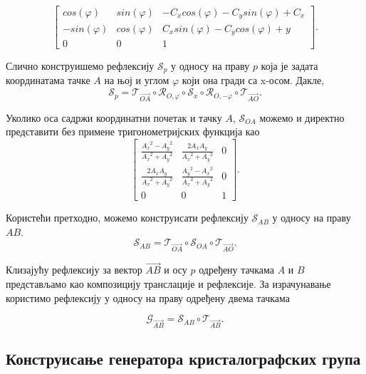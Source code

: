 \documentclass[12pt]{article}
\begin{document}
\[\begin{bmatrix}cos(\varphi) & sin(\varphi) & -C_x cos(\varphi) - C_y sin(\varphi) + C_x\\ -sin(\varphi) & cos(\varphi)&C_x sin(\varphi) - C_y cos(\varphi) +y\\ 0 & 0 & 1\end{bmatrix}.\]

Слично конструишемо рефлексију $\mathcal{S}_p$ у односу на праву $p$ која је задата координатама тачке $A$ на њој и углом $\varphi$ који она гради са x-осом. Дакле, 
$$\mathcal{S}_{p} = \mathcal{T}_{\overrightarrow{OA}} \circ \mathcal{R}_{O,\varphi} \circ \mathcal{S}_{x} \circ \mathcal{R}_{O,-\varphi} \circ \mathcal{T}_{\overrightarrow{AO}}.$$

Уколико оса садржи координатни почетак и тачку $A$, $\mathcal{S}_{OA}$ можемо и директно представити без примене тригонометријских функција као
\[\begin{bmatrix} \frac{{A_x}^2-{A_y}^2}{{A_x}^2+{A_y}^2} & \frac{2A_x A_y}{{A_x}^2+{A_y}^2} & 0\\ \frac{2A_x A_y}{{A_x}^2+{A_y}^2} & \frac{{A_y}^2-{A_x}^2}{{A_x}^2+{A_y}^2}&0 \\ 0 & 0 & 1\end{bmatrix}.\]

Користећи претходно, можемо конструисати рефлексију $\mathcal{S}_{AB}$ у односу на праву $AB$.
$$ \mathcal{S}_{AB}   = \mathcal{T}_{\overrightarrow{OA}} \circ \mathcal{S}_{OA} \circ \mathcal{T}_{\overrightarrow{AO}} . $$

Клизајућу рефлексију за вектор $\overrightarrow{AB}$ и осу $p$ одређену тачкама $A$ и $B$ представљамо као композицију транслације и рефлексије. За израчунавање користимо рефлексију у односу на праву одређену двема тачкама

$$ \mathcal{G}_{\overrightarrow{AB}} = \mathcal{S}_{AB} \circ \mathcal{T}_{\overrightarrow{AB}}.$$

\newpage
\subsection{Конструисање генератора кристалографских група}



\end{document}
